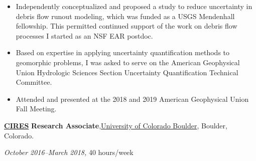 \documentclass[10pt]{article}
\begin{document}
\begin{itemize}
\item Independently conceptualized and proposed a study to reduce uncertainty in debris flow runout modeling, which was funded as a USGS Mendenhall fellowship. This permitted continued support of the work on debris flow processes I started as an NSF EAR postdoc. 
\item Based on expertise in applying uncertainty quantification methods to geomorphic problems, I was asked to serve on the American Geophysical Union Hydrologic Sciences Section Uncertainty Quantification Technical Committee. 
\item Attended and presented at the 2018 and 2019 American Geophysical Union Fall Meeting. 
\end{itemize} 
	
\href{https://cires.colorado.edu/}{\textbf{CIRES}} \textbf{Research Associate},\href{http://www.colorado.edu/}{{University of Colorado Boulder}}, Boulder, Colorado. 

\textit{October 2016--March 2018,}  40 hours/week
 
\end{document}
